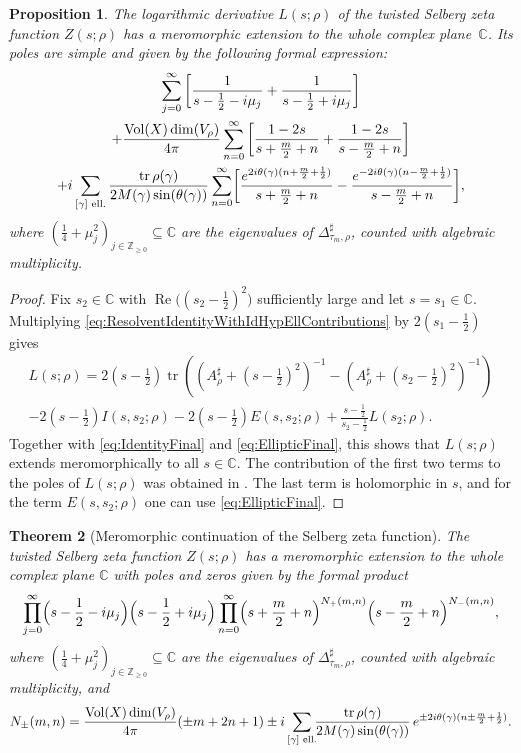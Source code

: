 \documentclass[JEP,XML,SOM,Unicode,NoFloatCountersInSection,published]{cedram}
\theoremstyle{plain}
\newtheorem{thm}{Theorem}[subsection]
\newtheorem{prop}[thm]{Proposition}
\theoremstyle{definition}
\theoremstyle{remark}
\newcommand{\Z}{\mathbb{Z}}
\newcommand{\C}{\mathbb{C}}
\DeclareMathOperator{\RE}{Re}
\DeclareMathOperator{\tr}{tr}
\DeclareMathOperator{\Vol}{Vol}
\numberwithin{equation}{section}
\begin{document}
\begin{prop}\label{prop:LMero}
The logarithmic derivative $L(s;\rho)$ of the twisted Selberg zeta function $Z(s;\rho)$ has a meromorphic extension to the whole complex plane~$\C$. Its poles are simple and given by the following formal expression:
\begin{multline*}
\sum_{j=0}^\infty\left[\frac{1}{s-\frac{1}{2}-i\mu_j}+\frac{1}{s-\frac{1}{2}+i\mu_j}\right]\\
+\frac{\Vol(X)\dim(V_\rho)}{4\pi}\sum_{n=0}^\infty\left[\frac{1-2s}{s+\frac{m}{2}+n}+\frac{1-2s}{s-\frac{m}{2}+n}\right]\\
+i\sum_{[\gamma]\textup{ ell.}}\frac{\tr\rho(\gamma)}{2M(\gamma)\sin(\theta(\gamma))}\sum_{n=0}^\infty\biggl[\frac{e^{2i\theta(\gamma)(n+\frac{m}{2}+\frac{1}{2})}}{s+\frac{m}{2}+n}-\frac{e^{-2i\theta(\gamma)(n-\frac{m}{2}+\frac{1}{2})}}{s-\frac{m}{2}+n}\biggr],
\end{multline*}
where $(\frac{1}{4}+\mu_j^2)_{j\in\Z_{\geq0}}\subseteq\C$ are the eigenvalues of $\Delta_{\tau_m,\rho}^\sharp$, counted with algebraic multiplicity.
\end{prop}

\begin{proof}
Fix $s_2\in\C$ with $\RE\big((s_2-\frac{1}{2})^2\big)$ sufficiently large and let $s=s_1\in\C$. Multiplying \cref{eq:ResolventIdentityWithIdHypEllContributions} by $2(s_1-\frac{1}{2})$ gives
\begin{multline*}
L(s;\rho) = 2(s-\tfrac{1}{2})\tr\left(\left(A_\rho^\sharp+(s-\tfrac{1}{2})^2\right)^{-1}-\left(A_\rho^\sharp+(s_2-\tfrac{1}{2})^2\right)^{-1}\right)\\
-2(s-\tfrac{1}{2})I(s,s_2;\rho)-2(s-\tfrac{1}{2})E(s,s_2;\rho)+\frac{s-\frac{1}{2}}{s_2-\frac{1}{2}}L(s_2;\rho).
\end{multline*}
Together with \cref{eq:IdentityFinal} and \cref{eq:EllipticFinal}, this shows that $L(s;\rho)$ extends meromorphically to all $s\in\C$. The contribution of the first two terms to the poles of $L(s;\rho)$ was obtained in \cite[Prop.\,4.2.5]{FS}. The last term is holomorphic in $s$, and for the term $E(s,s_2;\rho)$ one can use \cref{eq:EllipticFinal}.
\end{proof}

\begin{thm}[Meromorphic continuation of the Selberg zeta function]
\label{theo:mero}
The twisted Selberg zeta function $Z(s;\rho)$ has a meromorphic extension to the whole complex plane $\C$ with poles and zeros given by the formal product
\[
\prod_{j=0}^\infty\Bigl(s-\frac{1}{2}-i\mu_j\Bigr)\Bigl(s-\frac{1}{2}+i\mu_j\Bigr)\prod_{n=0}^\infty\Bigl(s+\frac{m}{2}+n\Bigr)^{N_+(m,n)}\Bigl(s-\frac{m}{2}+n\Bigr)^{N_-(m,n)},
\]
where $(\frac{1}{4}+\mu_j^2)_{j\in\Z_{\geq0}}\subseteq\C$ are the eigenvalues of $\Delta_{\tau_m,\rho}^\sharp$, counted with algebraic multiplicity, and
\[
N_\pm(m,n) = \frac{\Vol(X)\dim(V_\rho)}{4\pi}(\pm m+2n+1)\\
\pm i\sum_{[\gamma]\textup{ ell.}}\!\!\frac{\tr\rho(\gamma)}{2M(\gamma)\sin(\theta(\gamma))}\,e^{\pm2i\theta(\gamma)(n\pm\frac{m}{2}+\frac{1}{2})}.
\]
\end{thm}
\end{document}
